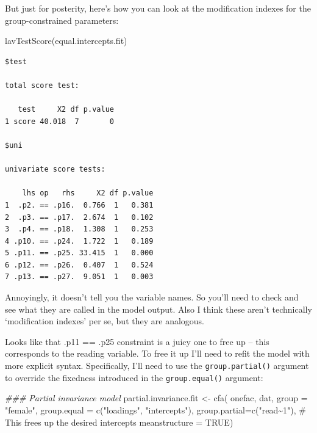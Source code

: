 \documentclass[
  letterpaper,
  DIV=11,
  numbers=noendperiod]{scrreprt}
\newenvironment{Shaded}{\begin{snugshade}}{\end{snugshade}}
\newcommand{\AttributeTok}[1]{\textcolor[rgb]{0.40,0.45,0.13}{#1}}
\newcommand{\CommentTok}[1]{\textcolor[rgb]{0.37,0.37,0.37}{#1}}
\newcommand{\ConstantTok}[1]{\textcolor[rgb]{0.56,0.35,0.01}{#1}}
\newcommand{\DocumentationTok}[1]{\textcolor[rgb]{0.37,0.37,0.37}{\textit{#1}}}
\newcommand{\FunctionTok}[1]{\textcolor[rgb]{0.28,0.35,0.67}{#1}}
\newcommand{\NormalTok}[1]{\textcolor[rgb]{0.00,0.23,0.31}{#1}}
\newcommand{\OtherTok}[1]{\textcolor[rgb]{0.00,0.23,0.31}{#1}}
\newcommand{\StringTok}[1]{\textcolor[rgb]{0.13,0.47,0.30}{#1}}
\begin{document}
But just for posterity, here's how you can look at the modification
indexes for the group-constrained parameters:

\begin{Shaded}
\begin{Highlighting}[]
\FunctionTok{lavTestScore}\NormalTok{(equal.intercepts.fit)}
\end{Highlighting}
\end{Shaded}

\begin{verbatim}
$test

total score test:

   test     X2 df p.value
1 score 40.018  7       0

$uni

univariate score tests:

    lhs op   rhs     X2 df p.value
1  .p2. == .p16.  0.766  1   0.381
2  .p3. == .p17.  2.674  1   0.102
3  .p4. == .p18.  1.308  1   0.253
4 .p10. == .p24.  1.722  1   0.189
5 .p11. == .p25. 33.415  1   0.000
6 .p12. == .p26.  0.407  1   0.524
7 .p13. == .p27.  9.051  1   0.003
\end{verbatim}

Annoyingly, it doesn't tell you the variable names. So you'll need to
check and see what they are called in the model output. Also I think
these aren't technically `modification indexes' per se, but they are
analogous.

Looks like that .p11 == .p25 constraint is a juicy one to free up --
this corresponds to the reading variable. To free it up I'll need to
refit the model with more explicit syntax. Specifically, I'll need to
use the \texttt{group.partial()} argument to override the fixedness
introduced in the \texttt{group.equal()} argument:

\begin{Shaded}
\begin{Highlighting}[]
\DocumentationTok{\#\#\# Partial invariance model}
\NormalTok{partial.invariance.fit }\OtherTok{\textless{}{-}} \FunctionTok{cfa}\NormalTok{(}
\NormalTok{  onefac, }
\NormalTok{  dat, }
  \AttributeTok{group =} \StringTok{"female"}\NormalTok{, }
  \AttributeTok{group.equal =} \FunctionTok{c}\NormalTok{(}\StringTok{"loadings"}\NormalTok{, }\StringTok{"intercepts"}\NormalTok{), }
  \AttributeTok{group.partial=}\FunctionTok{c}\NormalTok{(}\StringTok{"read\textasciitilde{}1"}\NormalTok{), }\CommentTok{\# This frees up the desired intercepts}
  \AttributeTok{meanstructure =} \ConstantTok{TRUE}\NormalTok{)}
\end{Highlighting}
\end{Shaded}
\end{document}
